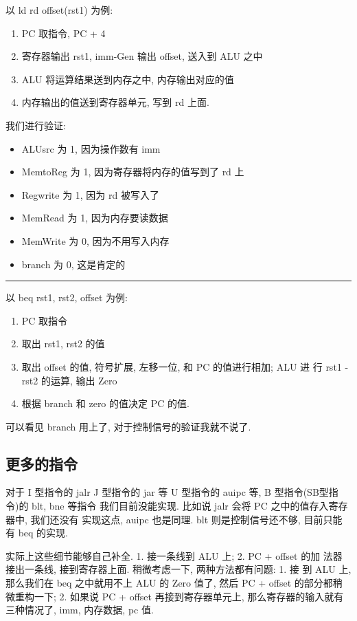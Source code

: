 \documentclass[11pt]{ctexart}
\begin{document}
以 ld rd offset(rst1) 为例:

\begin{enumerate}
\item PC 取指令, PC + 4
\item 寄存器输出 rst1, imm-Gen 输出 offset, 送入到 ALU 之中
\item ALU 将运算结果送到内存之中, 内存输出对应的值
\item 内存输出的值送到寄存器单元, 写到 rd 上面.
\end{enumerate}

我们进行验证: 
\begin{itemize}
\item ALUsrc   为 1, 因为操作数有 imm
\item MemtoReg 为 1, 因为寄存器将内存的值写到了 rd 上
\item Regwrite 为 1, 因为 rd 被写入了
\item MemRead  为 1, 因为内存要读数据
\item MemWrite 为 0, 因为不用写入内存
\item branch   为 0, 这是肯定的
\end{itemize}

\noindent\rule{\textwidth}{0.5pt}

以 beq rst1, rst2, offset 为例:

\begin{enumerate}
\item PC 取指令
\item 取出 rst1, rst2 的值
\item 取出 offset 的值, 符号扩展, 左移一位, 和 PC 的值进行相加; ALU 进
行 rst1 - rst2 的运算, 输出 Zero
\item 根据 branch 和 zero 的值决定 PC 的值.
\end{enumerate}

可以看见 branch 用上了, 对于控制信号的验证我就不说了. 
\subsection{更多的指令}
\label{sec:orge821a3b}

对于 I 型指令的 jalr 
     J 型指令的 jar 等
     U 型指令的 auipc 等, 
     B 型指令(SB型指令)的 blt, bne 等指令
我们目前没能实现. 比如说 jalr 会将 PC 之中的值存入寄存器中, 我们还没有
     实现这点, auipc 也是同理. blt 则是控制信号还不够, 目前只能有 beq
     的实现. 

实际上这些细节能够自己补全. 1. 接一条线到 ALU 上; 2. PC + offset 的加
法器接出一条线, 接到寄存器上面. 稍微考虑一下, 两种方法都有问题: 1. 接
到 ALU 上, 那么我们在 beq 之中就用不上 ALU 的 Zero 值了, 然后 PC +
offset 的部分都稍微重构一下; 2. 如果说 PC + offset 再接到寄存器单元上,
那么寄存器的输入就有三种情况了, imm, 内存数据, pc 值.  
\end{document}
